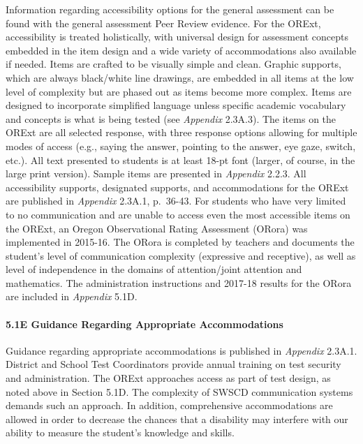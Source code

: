 \documentclass[]{article}
\let\oldparagraph\paragraph
\renewcommand{\paragraph}[1]{\oldparagraph{#1}\mbox{}}
\begin{document}
Information regarding accessibility options for the general assessment
can be found with the general assessment Peer Review evidence. For the
ORExt, accessibility is treated holistically, with universal design for
assessment concepts embedded in the item design and a wide variety of
accommodations also available if needed. Items are crafted to be
visually simple and clean. Graphic supports, which are always
black/white line drawings, are embedded in all items at the low level of
complexity but are phased out as items become more complex. Items are
designed to incorporate simplified language unless specific academic
vocabulary and concepts is what is being tested (see \emph{Appendix}
2.3A.3). The items on the ORExt are all selected response, with three
response options allowing for multiple modes of access (e.g., saying the
answer, pointing to the answer, eye gaze, switch, etc.). All text
presented to students is at least 18-pt font (larger, of course, in the
large print version). Sample items are presented in \emph{Appendix}
2.2.3. All accessibility supports, designated supports, and
accommodations for the ORExt are published in \emph{Appendix} 2.3A.1,
p.~36-43. For students who have very limited to no communication and are
unable to access even the most accessible items on the ORExt, an Oregon
Observational Rating Assessment (ORora) was implemented in 2015-16. The
ORora is completed by teachers and documents the student's level of
communication complexity (expressive and receptive), as well as level of
independence in the domains of attention/joint attention and
mathematics. The administration instructions and 2017-18 results for the
ORora are included in \emph{Appendix} 5.1D.

\hypertarget{e-guidance-regarding-appropriate-accommodations}{%
\paragraph{5.1E Guidance Regarding Appropriate
Accommodations}\label{e-guidance-regarding-appropriate-accommodations}}

Guidance regarding appropriate accommodations is published in
\emph{Appendix} 2.3A.1. District and School Test Coordinators provide
annual training on test security and administration. The ORExt
approaches access as part of test design, as noted above in Section
5.1D. The complexity of SWSCD communication systems demands such an
approach. In addition, comprehensive accommodations are allowed in order
to decrease the chances that a disability may interfere with our ability
to measure the student's knowledge and skills.
\end{document}

